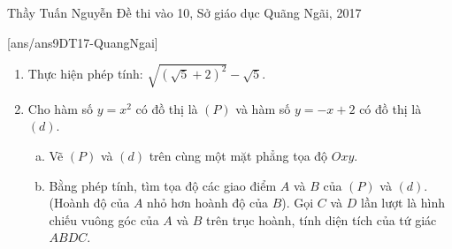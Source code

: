 
\begin{name}
{Thầy  Tuấn Nguyễn}
{Đề thi vào 10, Sở giáo dục Quãng Ngãi, 2017}
\end{name}
\setcounter{ex}{0}
[ans/ans9DT17-QuangNgai]
\begin{ex}%
    \hfill
\begin{enumerate}[1)]
        \item Thực hiện phép tính: $\sqrt{\left(\sqrt{5}+2\right)^2}-\sqrt{5}$.
        \item Cho hàm số $y=x^2$ có đồ thị là $\left(P\right)$ và hàm số $y=-x+2$ có đồ thị là $\left(d\right)$.
		\begin{enumerate}[a)]
			\item Vẽ $\left(P\right)$ và $\left(d\right)$ trên cùng một mặt phẳng tọa độ $Oxy$.
			\item Bằng phép tính, tìm tọa độ các giao điểm $A$ và $B$ của $\left(P\right)$ và $\left(d\right)$. (Hoành độ của $A$ nhỏ hơn hoành độ của $B$). Gọi $C$ và $D$ lần lượt là hình chiếu vuông góc của $A$ và $B$ trên trục hoành, tính diện tích của tứ giác $ABDC$. 
		\end{enumerate}
\end{enumerate}


\end{ex}
